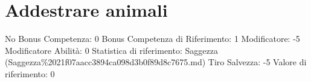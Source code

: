\section{Addestrare animali}\label{addestrare-animali}

\begin{description}
\tightlist
\item[Tags: ABI]
No Bonus Competenza: 0 Bonus Competenza di Riferimento: 1 Modificatore:
-5 Modificatore Abilità: 0 Statistica di riferimento: Saggezza
(Saggezza\%2021f07aacc3894ca098d3b0f89d8c7675.md) Tiro Salvezza: -5
Valore di riferimento: 0
\end{description}
